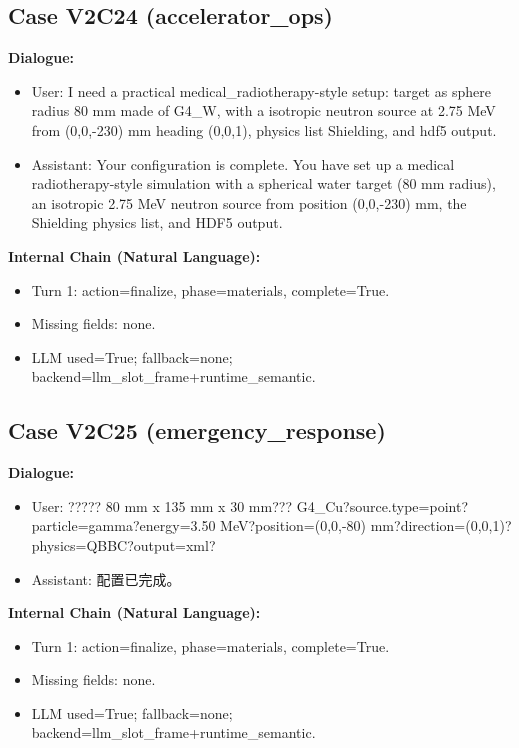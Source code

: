 \documentclass[11pt]{ctexart}
\begin{document}
\subsection{Case V2C24 (accelerator\_ops)}
\textbf{Dialogue:}
\begin{itemize}
\item User: I need a practical medical\_radiotherapy-style setup: target as sphere radius 80 mm made of G4\_W, with a isotropic neutron source at 2.75 MeV from (0,0,-230) mm heading (0,0,1), physics list Shielding, and hdf5 output.
\item Assistant: Your configuration is complete. You have set up a medical radiotherapy-style simulation with a spherical water target (80 mm radius), an isotropic 2.75 MeV neutron source from position (0,0,-230) mm, the Shielding physics list, and HDF5 output.
\end{itemize}
\textbf{Internal Chain (Natural Language):}
\begin{itemize}
\item Turn 1: action=finalize, phase=materials, complete=True.
\item Missing fields: none.
\item LLM used=True; fallback=none; backend=llm\_slot\_frame+runtime\_semantic.
\end{itemize}
\subsection{Case V2C25 (emergency\_response)}
\textbf{Dialogue:}
\begin{itemize}
\item User: ????? 80 mm x 135 mm x 30 mm??? G4\_Cu?source.type=point?particle=gamma?energy=3.50 MeV?position=(0,0,-80) mm?direction=(0,0,1)?physics=QBBC?output=xml?
\item Assistant: 配置已完成。
\end{itemize}
\textbf{Internal Chain (Natural Language):}
\begin{itemize}
\item Turn 1: action=finalize, phase=materials, complete=True.
\item Missing fields: none.
\item LLM used=True; fallback=none; backend=llm\_slot\_frame+runtime\_semantic.
\end{itemize}
\end{document}
